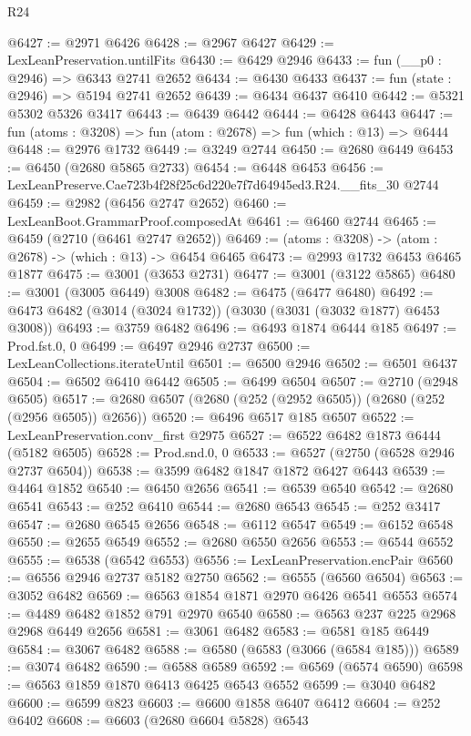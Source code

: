 \begin{lexlean}{R24}
\begin{coremodule}
@6427 := @2971 @6426
@6428 := @2967 @6427
@6429 := LexLeanPreservation.untilFits
@6430 := @6429 @2946
@6433 := fun (__p0 : @2946) => @6343 @2741 @2652
@6434 := @6430 @6433
@6437 := fun (state : @2946) => @5194 @2741 @2652
@6439 := @6434 @6437 @6410
@6442 := @5321 @5302 @5326 @3417
@6443 := @6439 @6442
@6444 := @6428 @6443
@6447 := fun (atoms : @3208) => fun (atom : @2678) => fun (which : @13) => @6444
@6448 := @2976 @1732
@6449 := @3249 @2744
@6450 := @2680 @6449
@6453 := @6450 (@2680 @5865 @2733)
@6454 := @6448 @6453
@6456 := LexLeanPreserve.Cae723b4f28f25c6d220e7f7d64945ed3.R24.__fits_30 @2744
@6459 := @2982 (@6456 @2747 @2652)
@6460 := LexLeanBoot.GrammarProof.composedAt
@6461 := @6460 @2744
@6465 := @6459 (@2710 (@6461 @2747 @2652))
@6469 := (atoms : @3208) -> (atom : @2678) -> (which : @13) -> @6454 @6465
@6473 := @2993 @1732 @6453 @6465 @1877
@6475 := @3001 (@3653 @2731)
@6477 := @3001 (@3122 @5865)
@6480 := @3001 (@3005 @6449) @3008
@6482 := @6475 (@6477 @6480)
@6492 := @6473 @6482 (@3014 (@3024 @1732)) (@3030 (@3031 (@3032 @1877) @6453 @3008))
@6493 := @3759 @6482
@6496 := @6493 @1874 @6444 @185
@6497 := Prod.fst.{0, 0}
@6499 := @6497 @2946 @2737
@6500 := LexLeanCollections.iterateUntil
@6501 := @6500 @2946
@6502 := @6501 @6437
@6504 := @6502 @6410 @6442
@6505 := @6499 @6504
@6507 := @2710 (@2948 @6505)
@6517 := @2680 @6507 (@2680 (@252 (@2952 @6505)) (@2680 (@252 (@2956 @6505)) @2656))
@6520 := @6496 @6517 @185 @6507
@6522 := LexLeanPreservation.conv_first @2975
@6527 := @6522 @6482 @1873 @6444 (@5182 @6505)
@6528 := Prod.snd.{0, 0}
@6533 := @6527 (@2750 (@6528 @2946 @2737 @6504))
@6538 := @3599 @6482 @1847 @1872 @6427 @6443
@6539 := @4464 @1852
@6540 := @6450 @2656
@6541 := @6539 @6540
@6542 := @2680 @6541
@6543 := @252 @6410
@6544 := @2680 @6543
@6545 := @252 @3417
@6547 := @2680 @6545 @2656
@6548 := @6112 @6547
@6549 := @6152 @6548
@6550 := @2655 @6549
@6552 := @2680 @6550 @2656
@6553 := @6544 @6552
@6555 := @6538 (@6542 @6553)
@6556 := LexLeanPreservation.encPair
@6560 := @6556 @2946 @2737 @5182 @2750
@6562 := @6555 (@6560 @6504)
@6563 := @3052 @6482
@6569 := @6563 @1854 @1871 @2970 @6426 @6541 @6553
@6574 := @4489 @6482 @1852 @791 @2970 @6540
@6580 := @6563 @237 @225 @2968 @2968 @6449 @2656
@6581 := @3061 @6482
@6583 := @6581 @185 @6449
@6584 := @3067 @6482
@6588 := @6580 (@6583 (@3066 (@6584 @185)))
@6589 := @3074 @6482
@6590 := @6588 @6589
@6592 := @6569 (@6574 @6590)
@6598 := @6563 @1859 @1870 @6413 @6425 @6543 @6552
@6599 := @3040 @6482
@6600 := @6599 @823
@6603 := @6600 @1858 @6407 @6412
@6604 := @252 @6402
@6608 := @6603 (@2680 @6604 @5828) @6543

\end{coremodule}
\end{lexlean}
